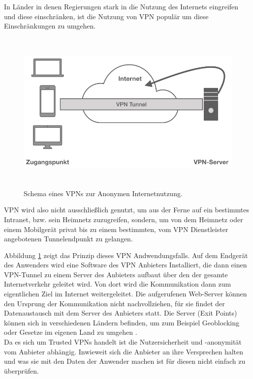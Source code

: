 In Länder in denen Regierungen stark in die Nutzung des Internets eingreifen und diese einschränken, ist die Nutzung von VPN populär um diese Einschränkungen zu umgehen.\\


\begin{figure}[h]
	\includegraphics[width=\linewidth,height=8cm]{vpnPrivat.001.jpeg}
	\caption{Schema eines VPNs zur Anonymen Internetnutzung.}
	\label{vpnPrivat}
\end{figure}

VPN wird also nicht ausschließlich genutzt, um aus der Ferne auf ein bestimmtes Intranet, bzw. sein Heimnetz zuzugreifen, sondern, um von dem Heimnetz oder einem Mobilgerät privat bis zu einem bestimmten, vom VPN Dienstleister angebotenen Tunnelendpunkt zu gelangen. 

Abbildung \ref{vpnPrivat} zeigt das Prinzip dieses VPN Andwendungsfalls. Auf dem Endgerät des Anwenders wird eine Software des VPN Anbieters Installiert, die dann einen VPN-Tunnel zu einem Server des Anbieters aufbaut über den der gesamte Internetverkehr geleitet wird. Von dort wird die Kommunikation dann zum eigentlichen Ziel im Internet weitergeleitet. Die aufgerufenen Web-Server können den Ursprung der Kommunikation nicht nachvollziehen, für sie findet der Datenaustausch mit dem Server des Anbieters statt. 
Die Server (Exit Points) können sich in verschiedenen Ländern befinden, um zum Beispiel Geoblocking oder Gesetze im eigenen Land zu umgehen \cite{perta2015glance}. \\

Da es sich um Trusted VPNs handelt ist die Nutzersicherheit und -anonymität vom Anbieter abhängig. Inwieweit sich die Anbieter an ihre Versprechen halten und was sie mit den Daten der Anwender machen ist für diesen nicht einfach zu überprüfen. 


